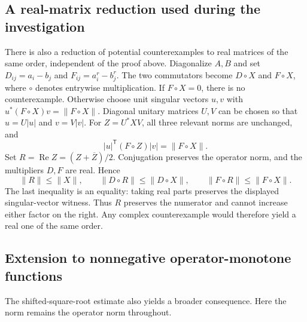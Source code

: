 \documentclass[11pt,a4paper]{article}
\theoremstyle{remark}
\begin{document}
\subsection{A real-matrix reduction used during the investigation}

There is also a reduction of potential counterexamples to real matrices
of the same order, independent of the proof above. Diagonalize $A,B$ and set
$D_{ij}=a_i-b_j$ and $F_{ij}=a_i^r-b_j^r$. The two commutators become
$D\circ X$ and $F\circ X$, where $\circ$ denotes entrywise multiplication.
If $F\circ X=0$, there is no counterexample. Otherwise choose unit singular
vectors $u,v$ with $u^*(F\circ X)v=\|F\circ X\|$. Diagonal unitary
matrices $U,V$ can be chosen so that $u=U|u|$ and $v=V|v|$.
For $Z=U^*XV$, all three relevant norms are unchanged, and
\[
 |u|^{\mathsf T}(F\circ Z)|v|=\|F\circ X\|.
\]
Set $R=\operatorname{Re}Z=(Z+\overline Z)/2$. Conjugation preserves the
operator norm, and the multipliers $D,F$ are real. Hence
\[
 \|R\|\le\|X\|,\qquad
 \|D\circ R\|\le\|D\circ X\|,\qquad
 \|F\circ R\|\le\|F\circ X\|.
\]
The last inequality is an equality: taking real parts preserves the
displayed singular-vector witness. Thus $R$ preserves the numerator
and cannot increase either factor on the right. Any complex
counterexample would therefore yield a real one of the same order.

\subsection{Extension to nonnegative operator-monotone functions}
\label{sec:897-operator-monotone}

The shifted-square-root estimate also yields a broader consequence.
Here the norm remains the operator norm throughout.
\end{document}
